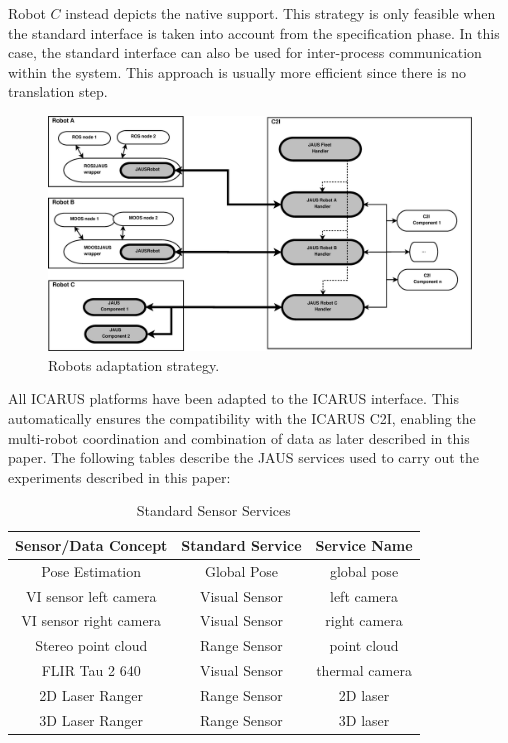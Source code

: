 \documentclass{article}
\begin{document}
Robot $C$ instead depicts the native support. This strategy is only feasible when the standard interface is taken into account from the specification phase. In this case, the standard interface can also be used for inter-process communication within the system. This approach is usually more efficient since there is no translation step.

\begin{figure} [h!]
    \centering
    \includegraphics[trim=0cm 0cm 0cm 0cm, width=\textwidth]{ROB-15-0035_fig2.eps}
    \caption{Robots adaptation strategy.}
    \label{fig:robot_adaptation}
\end{figure}

All ICARUS platforms have been adapted to the ICARUS interface. This automatically ensures the compatibility with the ICARUS C2I, enabling the multi-robot coordination and combination of data as later described in this paper. The following tables describe the JAUS services used to carry out the experiments described in this paper:

\begin{table}[h!]
\centering
\begin{tabular}{| c | c | c |}
\hline
Sensor/Data Concept & Standard Service & Service Name \\
\hline
Pose Estimation        & Global Pose   & global pose    \\ \hline
VI sensor left camera  & Visual Sensor & left camera    \\ \hline
VI sensor right camera & Visual Sensor & right camera   \\ \hline
Stereo point cloud     & Range Sensor & point cloud     \\ \hline
FLIR Tau 2 640 		   & Visual Sensor & thermal camera \\ \hline
2D Laser Ranger		   & Range Sensor & 2D laser 	    \\ \hline
3D Laser Ranger		   & Range Sensor & 3D laser 	    \\ \hline
\end{tabular}
\caption{Standard Sensor Services}
\label{table:sensorservices}
\end{table}
\end{document}
